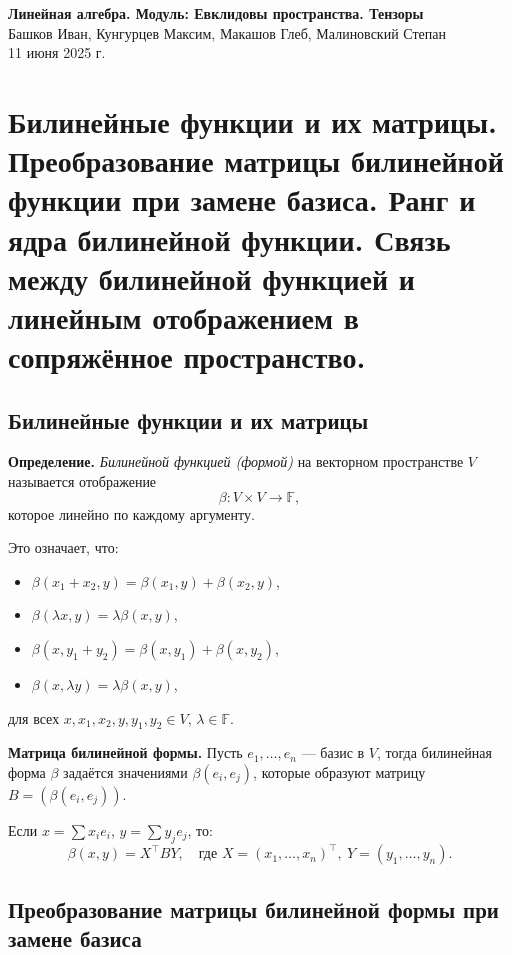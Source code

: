 \documentclass[12pt]{article}
\begin{document}
\begin{center}
    {\LARGE \textbf{Линейная алгебра. Модуль: Евклидовы пространства. Тензоры}}\\
    \vspace{0.3em}
    Башков Иван, Кунгурцев Максим, Макашов Глеб, Малиновский Степан\\
    \vspace{0.3em}
    11 июня 2025 г.
\end{center}

\section{Билинейные функции и их матрицы. Преобразование матрицы билинейной функции при замене базиса. Ранг и ядра билинейной функции. Связь между билинейной функцией и линейным отображением в сопряжённое пространство.}

\subsection{Билинейные функции и их матрицы}

\textbf{Определение.} \textit{Билинейной функцией (формой)} на векторном пространстве $V$ называется отображение 
\[
\beta: V \times V \to \mathbb{F},
\]
которое линейно по каждому аргументу.

Это означает, что:
\begin{itemize}
    \item $\beta(x_1 + x_2, y) = \beta(x_1, y) + \beta(x_2, y)$,
    \item $\beta(\lambda x, y) = \lambda \beta(x, y)$,
    \item $\beta(x, y_1 + y_2) = \beta(x, y_1) + \beta(x, y_2)$,
    \item $\beta(x, \lambda y) = \lambda \beta(x, y)$,
\end{itemize}
для всех $x, x_1, x_2, y, y_1, y_2 \in V$, $\lambda \in \mathbb{F}$.

\vspace{0.5em}
\textbf{Матрица билинейной формы.} Пусть $e_1, \dots, e_n$ — базис в $V$, тогда билинейная форма $\beta$ задаётся значениями $\beta(e_i, e_j)$, которые образуют матрицу $B = (\beta(e_i, e_j))$.

Если $x = \sum x_i e_i$, $y = \sum y_j e_j$, то:
\[
\beta(x, y) = X^\top B Y, \quad \text{где } X = (x_1, \dots, x_n)^\top,\ Y = (y_1, \dots, y_n).
\]

\subsection{Преобразование матрицы билинейной формы при замене базиса}
\end{document}
